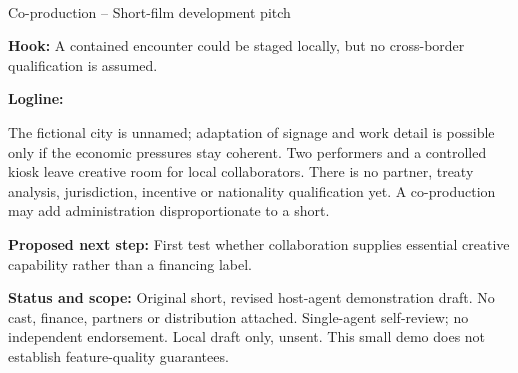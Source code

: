 \documentclass[11pt,letterpaper]{article}
\begin{document}
\begin{center}
{\Large\bfseries\sffamily \filmtitleupper}\\[6pt]
Co-production -- Short-film development pitch
\end{center}
\textbf{Hook:} A contained encounter could be staged locally, but no cross-border qualification is assumed.

\textbf{Logline:} \filmlogline

The fictional city is unnamed; adaptation of signage and work detail is possible only if the economic pressures stay coherent. Two performers and a controlled kiosk leave creative room for local collaborators. There is no partner, treaty analysis, jurisdiction, incentive or nationality qualification yet. A co-production may add administration disproportionate to a short.

\textbf{Proposed next step:} First test whether collaboration supplies essential creative capability rather than a financing label.

\textbf{Status and scope:} Original short, revised host-agent demonstration draft. No cast, finance, partners or distribution attached. Single-agent self-review; no independent endorsement. Local draft only, unsent. This small demo does not establish feature-quality guarantees.
\end{document}
